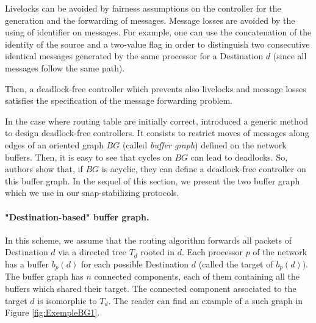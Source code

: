 \documentclass[11pt]{article}
\begin{document}
Livelocks can be avoided by fairness assumptions on the controller for the generation and the forwarding of messages. Message losses are avoided by the using of identifier on messages. For example, one can use the concatenation of the identity of the source and a two-value flag in order to distinguish two consecutive identical messages generated by the same processor for a Destination $d$ (since all messages follow the same path).

Then, a deadlock-free controller which prevents also livelocks and message losses satisfies the specification of the message forwarding problem.

In the case where routing table are initially correct, \cite{MS78} introduced a generic method to design deadlock-free controllers. It consists to restrict moves of messages along edges of an oriented graph $BG$ (called \emph{buffer graph}) defined on the network buffers. Then, it is easy to see that cycles on $BG$ can lead to deadlocks. So, authors show that, if $BG$ is acyclic, they can define a deadlock-free controller on this buffer graph. In the sequel of this section, we present the two buffer graph which we use in our snap-stabilizing protocols.

\paragraph{"Destination-based" buffer graph.} In this scheme, we assume that the routing algorithm forwards all packets of Destination $d$ via a directed tree $T_{d}$ rooted in $d$. Each processor $p$ of the network has a buffer $b_{p}(d)$ for each possible Destination $d$ (called the target of $b_{p}(d)$). The buffer graph has $n$ connected components, each of them containing all the buffers which shared their target. The connected component associated to the target $d$ is isomorphic to $T_{d}$. The reader can find an example of a such graph in Figure \ref{fig:ExempleBG1}.
\end{document}
